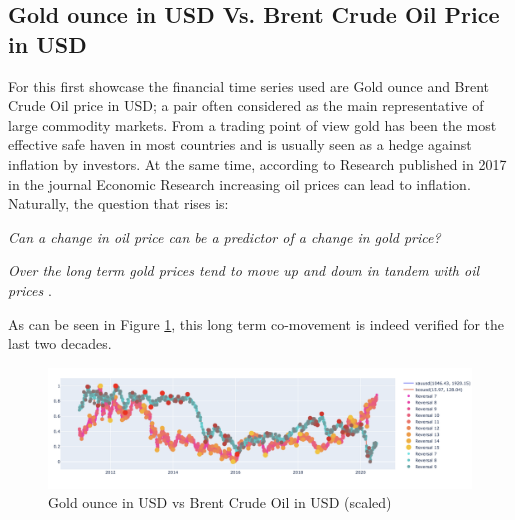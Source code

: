 \documentclass[a4, 11pt]{article}
\begin{document}
\subsection{Gold ounce in USD Vs. Brent Crude Oil Price in USD}
For this first showcase the financial time series used are Gold ounce and Brent Crude Oil price in USD; a pair often considered as the main representative of large commodity markets. From a trading point of view gold has been the most effective safe haven in most countries and is usually seen as a hedge against inflation by investors. At the same time, according to Research published in 2017 in the journal Economic Research \cite{EconomicJournal} increasing oil prices can lead to inflation. Naturally, the question that rises is:
\begin{center}
    \textit{Can a change in oil price can be a predictor of a change in gold price?}\\[2ex]
\end{center}
\begin{center}
\textit{Over the long term gold prices tend to move up and down in tandem with oil prices} \cite{OilPrice}.    
\end{center}
As can be seen in Figure \ref{fig:GoldOilScalled}, this long term co-movement is indeed verified for the last two decades.
\begin{figure}[!ht]
    \centering
    \includegraphics[width=1.1\textwidth]{Images/GoldOil.png}
    \caption{Gold ounce in USD vs Brent Crude Oil in USD (scaled)}
    \label{fig:GoldOilScalled}
\end{figure}
\end{document}
